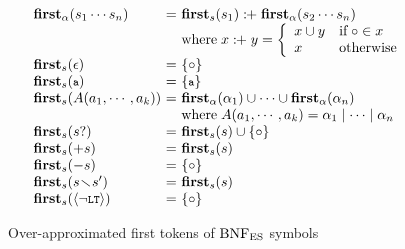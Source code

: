\begin{figure}[t]
\centering
\small
\[
  \begin{array}{l@{~}c@{~}l}
    \rhsfirst{\symb_1 \cdots \symb_n} &=& \symbfirst{\symb_1} \firstplus
    \rhsfirst{\symb_2 \cdots \symb_n}\\
    && \text{where} \; x \firstplus y = \left\{
    \begin{array}{ll}
      x \cup y & \text{if} \; \emptyfirst \in x\\
      x & \text{otherwise}\\
    \end{array}
    \right.\\
    \symbfirst{\epsilon} &=& \{ \emptyfirst \}\\
    \symbfirst{\T{a}} &=& \{ \T{a} \} \\
    \symbfirst{\NT{A}(\argument_1, \cdots, \argument_k)} &=&
    \rhsfirst{\rhs_1} \cup \cdots \cup \rhsfirst{\rhs_n}\\
    && \text{where} \; \NT{A}(\argument_1, \cdots, \argument_k) =
    \rhs_1 \mid \cdots \mid \rhs_n\\
    \symbfirst{\symb?} &=& \symbfirst{\symb} \cup \{ \emptyfirst \}\\
    \symbfirst{+\symb} &=& \symbfirst{\symb}\\
    \symbfirst{-\symb} &=& \{ \emptyfirst \}\\
    \symbfirst{\symb \butnot \symb'} &=& \symbfirst{\symb}\\
    \symbfirst{\nolt} &=& \{ \emptyfirst \}
  \end{array}
\]
\vspace*{-1em}
\caption{Over-approximated first tokens of \( \text{BNF}_{\text{ES}} \) symbols}
\label{fig:first-tokens}
\vspace{-1em}
\end{figure}

\smallskip


